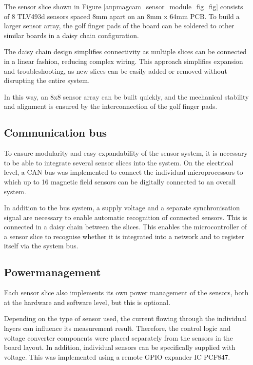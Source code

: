 \documentclass[conference]{IEEEtran}
\begin{document}
The sensor slice shown in Figure \ref{anpmagcam_sensor_module_fig_fig} consists of 8 TLV493d sensors spaced 8mm apart on an 8mm x 64mm PCB.
To build a larger sensor array, the golf finger pads of the board can be soldered to other similar boards in a daisy chain configuration.

The daisy chain design simplifies connectivity as multiple slices can be connected in a linear fashion, reducing complex wiring.
This approach simplifies expansion and troubleshooting, as new slices can be easily added or removed without disrupting the entire system.

In this way, an 8x8 sensor array can be built quickly, and the mechanical stability and alignment is ensured by the interconnection of the golf finger pads.

\subsection{Communication bus}

To ensure modularity and easy expandability of the sensor system, it is necessary to be able to integrate several sensor slices into the system.
On the electrical level, a CAN bus was implemented to connect the individual microprocessors to which up to 16 magnetic field sensors can be digitally connected to an overall system.

In addition to the bus system, a supply voltage and a separate synchronisation signal are necessary to enable automatic recognition of connected sensors. This is connected in a daisy chain between the slices.
This enables the microcontroller of a sensor slice to recognise whether it is integrated into a network and to register itself via the system bus.



\subsection{Powermanagement}

Each sensor slice also implements its own power management of the sensors, both at the hardware and software level, but this is optional.

Depending on the type of sensor used, the current flowing through the individual layers can influence its measurement result.
Therefore, the control logic and voltage converter components were placed separately from the sensors in the board layout.
In addition, individual sensors can be specifically supplied with voltage. This was implemented using a remote GPIO expander IC PCF847.
\end{document}
